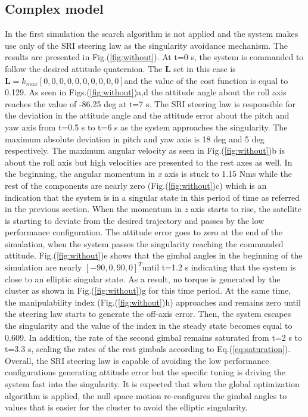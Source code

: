 \documentclass[journal]{new-aiaa}
\begin{document}
\subsection{Complex model}
In the first simulation the search algorithm is not applied and the system makes use only of the SRI steering law as the singularity avoidance mechanism. The results are presented in Fig.(\ref{fig:without}). At t=0 s, the system is commanded to follow the desired attitude quaternion. The $\textbf{L}$ set in this case is $ \textbf{L}=k_{max}[0,0,0,0,0,0,0,0,0,0]$and the value of the cost function is equal to 0.129. As seen in Figs.(\ref{fig:without})a,d the attitude angle about the roll axis reaches the value of -86.25 deg at t=7 s.  The SRI steering law is responsible for the deviation in the attitude angle and the attitude error about the pitch and yaw axis from t=0.5 s to t=6 s as the system approaches the singularity. The maximum absolute deviation in pitch and yaw axis is 18 deg and 5 deg respectively. The maximum angular velocity as seen in Fig.(\ref{fig:without})b is about the roll axis but high velocities are presented to the rest axes as well. In the beginning, the angular momentum in \textit{x} axis is stuck to 1.15 Nms while the rest of the components are nearly zero (Fig.(\ref{fig:without})c) which is an indication that the system is in a singular state in this period of time as referred in the previous section. When the momentum in \textit{z} axis starts to rise, the satellite is starting to deviate from the desired trajectory and passes by the low performance configuration. The attitude error goes to zero at the end of the simulation, when the system passes the singularity reaching the commanded attitude. Fig.(\ref{fig:without})e shows that the gimbal angles in the beginning of the simulation are nearly $[-90,0,90,0]^T$until t=1.2 s indicating that the system is close to an elliptic singular state. As a result, no torque is generated by the cluster as shown in Fig.(\ref{fig:without})g for this time period. At the same time, the manipulability index (Fig.(\ref{fig:without})h) approaches and remains zero until the steering law starts to generate the off-axis error. Then, the system escapes the singularity and the value of the index in the steady state becomes equal to 0.609. In addition, the rate of the second gimbal remains saturated from t=2 s to t=3.3 s, scaling the rates of the rest gimbals according to Eq.(\ref{eq:saturation}).
Overall, the SRI steering law is capable of avoiding the low performance configurations generating attitude error but the specific tuning is driving the system fast into the singularity. It is expected that when the global optimization algorithm is applied, the null space motion re-configures the gimbal angles to values that is easier for the cluster to avoid the elliptic singularity.
\end{document}
